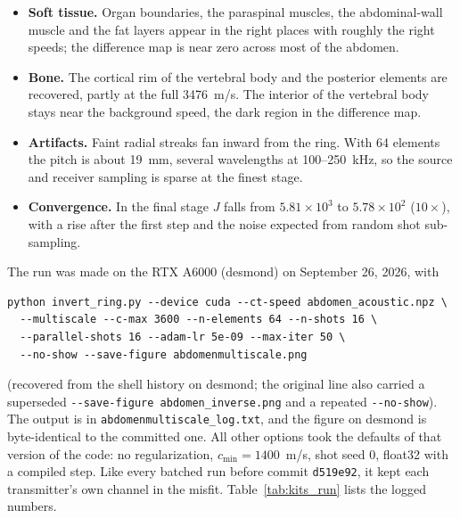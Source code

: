 \documentclass[11pt]{article}
\newcommand{\code}[1]{\texttt{#1}}
\begin{document}
\begin{itemize}
  \item \textbf{Soft tissue.} Organ boundaries, the paraspinal muscles, the
    abdominal-wall muscle and the fat layers appear in the right places with
    roughly the right speeds; the difference map is near zero across most of
    the abdomen.
  \item \textbf{Bone.} The cortical rim of the vertebral body and the posterior
    elements are recovered, partly at the full 3476~m/s. The interior of the
    vertebral body stays near the background speed, the dark region in the
    difference map.
  \item \textbf{Artifacts.} Faint radial streaks fan inward from the ring. With
    64 elements the pitch is about 19~mm, several wavelengths at
    100--250~kHz, so the source and receiver sampling is sparse at the finest
    stage.
  \item \textbf{Convergence.} In the final stage $J$ falls from
    $5.81\times10^{3}$ to $5.78\times10^{2}$ ($10\times$), with a rise after
    the first step and the noise expected from random shot sub-sampling.
\end{itemize}

The run was made on the RTX A6000 (desmond) on September 26, 2026, with
\begin{verbatim}
python invert_ring.py --device cuda --ct-speed abdomen_acoustic.npz \
  --multiscale --c-max 3600 --n-elements 64 --n-shots 16 \
  --parallel-shots 16 --adam-lr 5e-09 --max-iter 50 \
  --no-show --save-figure abdomenmultiscale.png
\end{verbatim}
(recovered from the shell history on desmond; the original line also carried a
superseded \code{-{}-save-figure abdomen\_inverse.png} and a repeated
\code{-{}-no-show}). The output is in \code{abdomenmultiscale\_log.txt}, and
the figure on desmond is byte-identical to the committed one. All other
options took the defaults of that version of the code: no regularization,
$c_{\min} = 1400$~m/s, shot seed 0, float32 with a compiled step. Like every
batched run before commit \code{d519e92}, it kept each transmitter's own
channel in the misfit. Table~\ref{tab:kits_run} lists the logged numbers.
\end{document}
